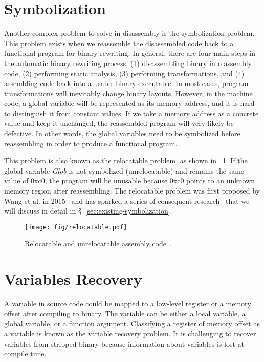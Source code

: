 \section{Symbolization} \label{sec:challenges-symbol}
Another complex problem to solve in disassembly is the symbolization problem.
This problem exists when we reassemble the disassembled code back to a
functional program for binary rewriting. In general, there are four main steps
in the automatic binary rewriting process, (1) disassembling binary into
assembly code, (2) performing static analysis, (3) performing transformations,
and (4) assembling code back into a usable binary executable.
In most cases, program transformations will inevitably change binary layouts.
However, in the machine code, a global variable will be represented as its
memory address, and it is hard to distinguish it from constant values. If we
take a memory address as a concrete value and keep it unchanged, the
reassembled program will very likely be defective. In other words, the global
variables need to be symbolized before reassembling in order to produce a
functional program.

This problem is also known as the relocatable problem, as shown in
\F~\ref{fig:relocatable}. If the global variable \textit{Glob} is not
symbolized (unrelocatable) and remains the same value of 0xc0, the program will
be unusable because 0xc0 points to an unknown memory region after reassembling.
The relocatable problem was first proposed by Wang et al. in
2015~\cite{wang2015reassembleable} and has sparked a series of consequent
research~\cite{wang2017ramblr,williams2020egalito,dinesh2020retrowrite} that we
will discuss in detail in \S~\ref{sec:existing-symbolization}.

\begin{figure}[tb]
  \centering
  \texttt{[image: fig/relocatable.pdf]}
  \caption{Relocatable and unrelocatable assembly code~\cite{wang2015reassembleable}.}
  \label{fig:relocatable}
\end{figure}


\section{Variables Recovery} \label{sec:challenges-variable}
A variable in source code could be mapped to a low-level register or a memory
offset after compiling to binary.
The variable can be either a local variable, a global variable, or a function
argument.
Classifying a register of memory offset as a variable is known as the variable
recovery problem.
It is challenging to recover variables from stripped binary because information
about variables is lost at compile time.

